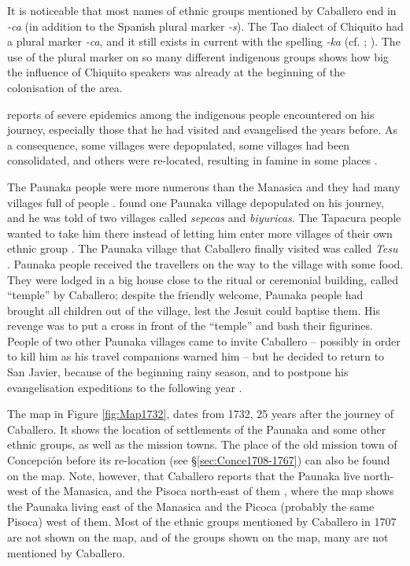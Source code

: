 It is noticeable that most names of ethnic groups mentioned by Caballero end in \textit{-ca} (in addition to the Spanish plural marker \textit{-s}). The Tao dialect of Chiquito had a plural marker \textit{-ca}, and it still exists in current  with the spelling \mbox{\textit{-ka}} (cf. \citealt[21]{Sans2013}; \citealt[272]{Galeote2014}). The use of the plural marker on so many different indigenous groups shows how big the influence of Chiquito speakers was already at the beginning of the colonisation of the area.

\citet[67, 83 etc.]{Matienzo_et_al2011} reports of severe epidemics among the indigenous people encountered on his journey, especially those that he had visited and evangelised the years before. %
As a consequence, some villages were depopulated, some villages had been consolidated, and others were re-located, resulting in famine in some places \citep[77, 84, 87]{Matienzo_et_al2011}.

The Paunaka people were more numerous than the Manasica and they had many villages full of people \citep[55, 85]{Matienzo_et_al2011}.
\citet[76]{Matienzo_et_al2011} found one Paunaka village depopulated on his journey, and he was told of two villages called \textit{sepecas} and \textit{biyuricas}. The Tapacura people wanted to take him there instead of letting him enter more villages of their own ethnic group \citep[81]{Matienzo_et_al2011}.
The Paunaka village that Caballero finally visited was called \textit{Tesu} \citep[84]{Matienzo_et_al2011}. Paunaka people received the travellers on the way to the village with some food. They were lodged in a big house close to the ritual or ceremonial building, called “temple” by Caballero; despite the friendly welcome, Paunaka people had brought all children out of the village, lest the Jesuit could baptise them. His revenge was to put a cross in front of the “temple” and bash their figurines.
People of two other Paunaka villages came to invite Caballero – possibly in order to kill him as his travel companions warned him – but he decided to return to San Javier, because of the beginning rainy season, and to postpone his evangelisation expeditions to the following year \citep[85--86]{Matienzo_et_al2011}.


The map in Figure \ref{fig:Map1732}, dates from 1732, 25 years after the journey of Caballero. It shows the location of settlements of the Paunaka and some other ethnic groups, as well as the mission towns. The place of the old mission town of Concepción before its re-location (see §\ref{sec:Conce1708-1767}) can also be found on the map. Note, however, that Caballero reports that the Paunaka live north-west of the Manasica, and the Pisoca north-east of them \citep[54]{Matienzo_et_al2011}, where the map shows the Paunaka living east of the Manasica and the Picoca (probably the same Pisoca) west of them. Most of the ethnic groups mentioned by Caballero in 1707 are not shown on the map, and of the groups shown on the map, many are not mentioned by Caballero.

